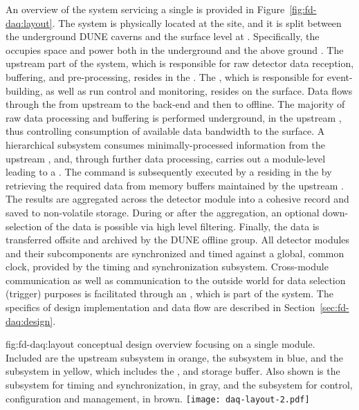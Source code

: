 An overview of the    system 
servicing a single 
 is
provided in Figure~\ref{fig:fd-daq:layout}. The system is
physically located at the  site, and it is split between the
underground DUNE caverns and the surface level at . Specifically, the  occupies space and
power both in the underground  and the above ground .
The upstream part of the system, which is responsible for
raw detector data reception, buffering, and pre-processing, resides in the .
The ,
which is responsible for
event-building, as well as run control and monitoring, resides on the
surface.
Data flows through the  from 
upstream to the back-end and then to offline. The majority
of raw data processing and buffering is performed underground, in the
upstream , thus controlling consumption of available data bandwidth  to the surface. A
hierarchical  subsystem consumes minimally-processed
information from the upstream , and, through further data processing, 
carries out a module-level  leading to a .
The command is subsequently executed by a  residing in the 
by retrieving the required data from memory buffers maintained by the upstream .
The results are aggregated across the detector module into a cohesive record and saved to non-volatile storage.
During or after the aggregation, an optional down-selection of the data is possible via
high level filtering.
Finally, the data is  transferred offsite and archived by the DUNE offline group.
All
detector modules and their subcomponents are synchronized and timed against a global,
common clock, provided by the timing and synchronization
subsystem. Cross-module communication as well as communication
to the outside world for data selection (trigger) purposes is facilitated
through an , which is part of the 
system. The
specifics of design implementation and data flow are described in Section~\ref{sec:fd-daq:design}.

\begin{dunefigure}{fig:fd-daq:layout}{ conceptual design overview focusing
    on a single \nominalmodsize module. Included are the upstream
     subsystem in orange, the  subsystem in
    blue, and the  subsystem in yellow,
    which includes the ,  and storage buffer. 
    Also shown is the subsystem for timing and
    synchronization, in gray, and the subsystem for control,
    configuration and management, in brown.
  }
  \texttt{[image: daq-layout-2.pdf]}
\end{dunefigure}


